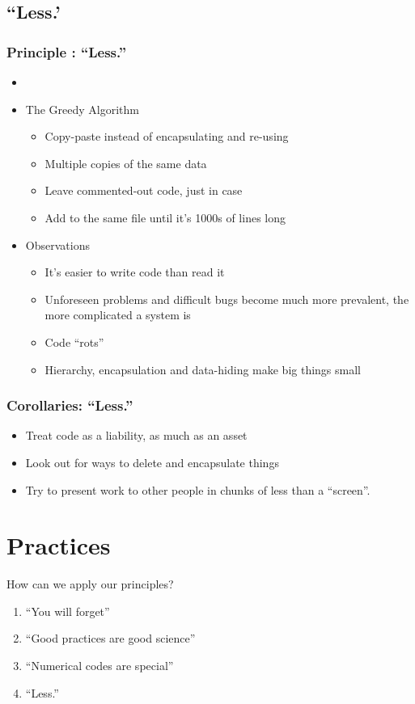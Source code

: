 \documentclass{beamer}
\begin{document}
\subsection{``Less.'}
\begin{frame}[fragile]
\frametitle{Principle : ``Less.''}
\begin{itemize}
\item
\item The Greedy Algorithm
\begin{itemize}
\item Copy-paste instead of encapsulating and re-using
\item Multiple copies of the same data
\item Leave commented-out code, just in case
\item Add to the same file until it's 1000s of lines long
\end{itemize}
\item Observations
\begin{itemize}
\item It's easier to write code than read it
\item Unforeseen problems and difficult bugs become much more prevalent, the more complicated a system is
\item Code ``rots''
\item Hierarchy, encapsulation and data-hiding make big things small
\end{itemize}
\end{itemize}
\end{frame}

\begin{frame}[fragile]
\frametitle{Corollaries: ``Less.''}
\begin{itemize}
\item Treat code as a liability, as much as an asset
\item Look out for ways to delete and encapsulate things
\item Try to present work to other people in chunks of less than a ``screen''.
\end{itemize}
\end{frame}

\section{Practices}

\begin{frame}[fragile]
How can we apply our principles?
\begin{enumerate}
\item``You will forget''
\item``Good practices are good science''
\item``Numerical codes are special''
\item``Less.''
\end{enumerate}
\end{frame}
\end{document}
